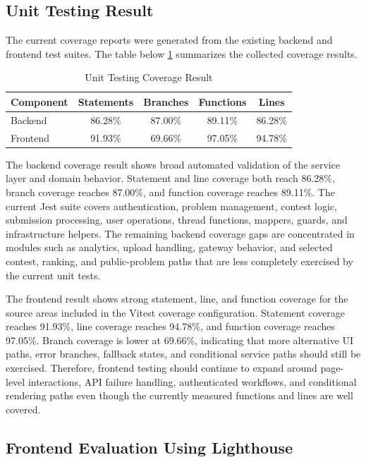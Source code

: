 \subsection{Unit Testing Result}

The current coverage reports were generated from the existing backend and frontend test suites. The table below \ref{tab:unit-test-coverage} summarizes the collected coverage results.


\begin{table}[H]
\centering
\caption{Unit Testing Coverage Result}
\label{tab:unit-test-coverage}
\begin{tabular}{|l|c|c|c|c|}
\hline
\textbf{Component} & \textbf{Statements} & \textbf{Branches} & \textbf{Functions} & \textbf{Lines} \\
\hline
Backend & 86.28\% & 87.00\% & 89.11\% & 86.28\% \\
\hline
Frontend & 91.93\% & 69.66\% & 97.05\% & 94.78\% \\
\hline
\end{tabular}
\end{table}

The backend coverage result shows broad automated validation of the service layer and domain behavior. Statement and line coverage both reach 86.28\%, branch coverage reaches 87.00\%, and function coverage reaches 89.11\%. The current Jest suite covers authentication, problem management, contest logic, submission processing, user operations, thread functions, mappers, guards, and infrastructure helpers. The remaining backend coverage gaps are concentrated in modules such as analytics, upload handling, gateway behavior, and selected contest, ranking, and public-problem paths that are less completely exercised by the current unit tests.

The frontend result shows strong statement, line, and function coverage for the source areas included in the Vitest coverage configuration. Statement coverage reaches 91.93\%, line coverage reaches 94.78\%, and function coverage reaches 97.05\%. Branch coverage is lower at 69.66\%, indicating that more alternative UI paths, error branches, fallback states, and conditional service paths should still be exercised. Therefore, frontend testing should continue to expand around page-level interactions, API failure handling, authenticated workflows, and conditional rendering paths even though the currently measured functions and lines are well covered.

\subsection{Frontend Evaluation Using Lighthouse}

